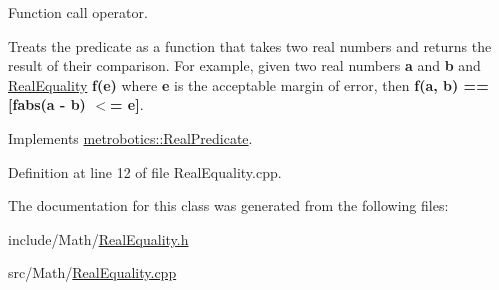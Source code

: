 \-Function call operator. 

\-Treats the predicate as a function that takes two real numbers and returns the result of their comparison. \-For example, given two real numbers {\bfseries a} and {\bfseries b} and {\ttfamily \hyperlink{classmetrobotics_1_1RealEquality}{\-Real\-Equality}} {\bfseries f(e)} where {\bfseries e} is the acceptable margin of error, then {\bfseries f(a, b) == \mbox{[}fabs(a -\/ b) $<$= e\mbox{]}}. 

\-Implements \hyperlink{classmetrobotics_1_1RealPredicate_aff9d2e8629a14fcf743ff36c221e08bd}{metrobotics\-::\-Real\-Predicate}.



\-Definition at line 12 of file \-Real\-Equality.\-cpp.



\-The documentation for this class was generated from the following files\-:\begin{DoxyCompactItemize}
\item 
include/\-Math/\hyperlink{RealEquality_8h}{\-Real\-Equality.\-h}\item 
src/\-Math/\hyperlink{RealEquality_8cpp}{\-Real\-Equality.\-cpp}\end{DoxyCompactItemize}
